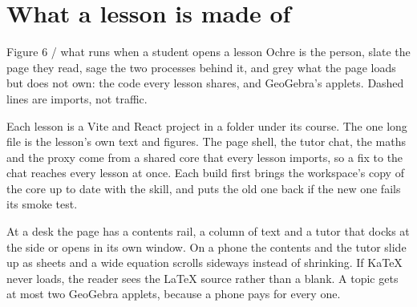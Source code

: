 \documentclass[11pt]{article}
\begin{document}
\newpage

\section{What a lesson is made of}


\begin{hsfigure}{Figure 6 / what runs when a student opens a lesson}%
{Ochre is the person, slate the page they read, sage the two processes behind it, and grey what
the page loads but does not own: the code every lesson shares, and GeoGebra's applets. Dashed
lines are imports, not traffic.}
\end{hsfigure}

Each lesson is a Vite and React project in a folder under its course. The one long file is the
lesson's own text and figures. The page shell, the tutor chat, the maths and the proxy come from
a shared core that every lesson imports, so a fix to the chat reaches every lesson at once. Each
build first brings the workspace's copy of the core up to date with the skill, and puts the old
one back if the new one fails its smoke test.

At a desk the page has a contents rail, a column of text and a tutor that docks at the side or
opens in its own window. On a phone the contents and the tutor slide up as sheets and a wide
equation scrolls sideways instead of shrinking. If KaTeX never loads, the reader sees the LaTeX
source rather than a blank. A topic gets at most two GeoGebra applets, because a phone pays for
every one.

\newpage
\end{document}
